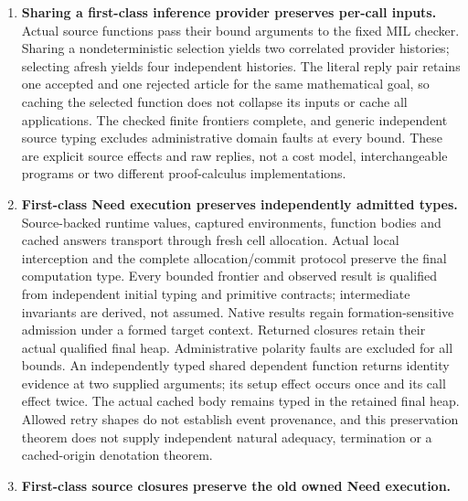 \documentclass[11pt]{article}
\theoremstyle{definition}
\theoremstyle{remark}
\begin{document}
\begin{enumerate}
  wrong intermediate evidence, forged acceptance and stale requests fail.
  Data typing does not certify a theorem. A reified native-argument function
  and value-level caller now preserve this admission connection through
  actual higher-order passage, with exact lexical origins and final worlds.
  A separate executable materializer reconstructs arbitrary accepted trees
  of the existing mother/father/chain calculus and produces exactly their
  independently qualified native artifacts. It does not supply arbitrary
  learned-rule interpretations, an installed machine primitive or a C
  realization.
\item \textbf{Sharing a first-class inference provider preserves per-call inputs.}
  Actual source functions pass their bound arguments to the fixed MIL
  checker. Sharing a nondeterministic selection yields two correlated
  provider histories; selecting afresh yields four independent histories.
  The literal reply pair retains one accepted and one rejected article
  for the same mathematical goal, so caching the selected function does
  not collapse its inputs or cache all applications. The checked finite
  frontiers complete, and generic independent source typing excludes
  administrative domain faults at every bound. These are explicit source
  effects and raw replies, not a cost model, interchangeable programs or
  two different proof-calculus implementations.
\item \textbf{First-class Need execution preserves independently admitted types.}
  Source-backed runtime values, captured environments, function bodies and
  cached answers transport through fresh cell allocation. Actual local
  interception and the complete allocation/commit protocol preserve the
  final computation type. Every bounded frontier and observed result is
  qualified from independent initial typing and primitive contracts;
  intermediate invariants are derived, not assumed. Native results regain
  formation-sensitive admission under a formed target context. Returned
  closures retain their actual qualified final heap. Administrative polarity
  faults are excluded for all bounds. An independently typed shared dependent
  function returns identity evidence at two supplied arguments; its setup
  effect occurs once and its call effect twice. The actual cached body remains
  typed in the retained final heap. Allowed retry shapes do not establish
  event provenance, and this preservation theorem does not supply independent
  natural adequacy, termination or a cached-origin denotation theorem.
\item \textbf{First-class source closures preserve the old owned Need execution.}

\end{enumerate}
\end{document}
